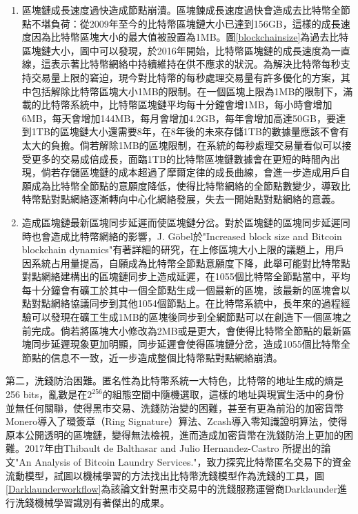 					\begin{enumerate}
						\item 區塊鏈成⾧速度過快造成節點崩潰。區塊鍊成長速度過快會造成去比特幣全節點不堪負荷：從2009年至今的比特幣區塊鏈大小已達到156GB，這樣的成長速度因為比特幣區塊大小的最大值被設置為1MB。圖\ref{blockchainsize}為過去比特區塊鏈大小，圖中可以發現，於2016年開始，比特幣區塊鏈的成長速度為一直線，這表示著比特幣網絡中持續維持在供不應求的狀況。為解決比特幣每秒⽀持交易量上限的窘迫，現今對⽐特幣的每秒處理交易量有許多優化的⽅案，其中包括解除比特幣區塊大小1MB的限制。在一個區塊上限為1MB的限制下，滿載的比特幣系統中，比特幣區塊鏈平均每十分鐘會增1MB，每小時會增加6MB，每天會增加144MB，每月會增加4.2GB，每年會增加高達50GB，要達到1TB的區塊鏈大小還需要8年，在8年後的未來存儲1TB的數據量應該不會有太大的負擔。倘若解除1MB的區塊限制，在系統的每秒處理交易量看似可以接受更多的交易成倍成長，面臨1TB的比特幣區塊鏈數據會在更短的時間內出現，倘若存儲區塊鏈的成本超過了摩爾定律的成長曲線，會進一步造成用戶自願成為比特幣全節點的意願度降低，使得比特幣網絡的全節點數變少，導致比特幣點對點網絡逐漸轉向中心化網絡發展，失去一開始點對點網絡的意義。

						\item 造成區塊鏈最新區塊同步延遲而使區塊鏈分岔。對於區塊鏈的區塊同步延遲同時也會造成比特幣網絡的影響，J. Göbel於"Increased block size and Bitcoin blockchain dynamics"\supercite{TelecommunicationNetworksandApplicationsConferenceITNAC201727thInternational}有著詳細的研究，在上修區塊大小上限的議題上，用戶因系統占用量提高，⾃願成為⽐特幣全節點意願度下降，此舉可能對⽐特幣點對點網絡建構出的區塊鏈同步上造成延遲，在1055個比特幣全節點當中，平均每十分鐘會有礦工於其中一個全節點生成一個最新的區塊，該最新的區塊會以點對點網絡協議同步到其他1054個節點上。在比特幣系統中，長年來的過程經驗可以發現在礦工生成1MB的區塊後同步到全網節點可以在創造下一個區塊之前完成。倘若將區塊大小修改為2MB或是更大，會使得比特幣全節點的最新區塊同步延遲現象更加明顯，同步延遲會使得區塊鏈分岔，造成1055個比特幣全節點的信息不一致，近一步造成整個比特幣點對點網絡崩潰。
					\end{enumerate}
					

				第二，洗錢防治困難。匿名性為比特幣系統一大特色，比特幣的地址生成的熵是256 bits，亂數是在$2^{256}$的組態空間中隨機選取，這樣的地址與現實生活中的身份並無任何關聯，使得黑市交易、洗錢防治變的困難，甚至有更為前沿的加密貨幣Monero\supercite{noether2014monero}導入了環簽章（Ring Signature）\supercite{Thresholdringsignaturesandapplicationstoad-hocgroups}算法、Zcash\supercite{zhong2002faster}導入零知識證明算法\supercite{Zero-KnowledgeProofsofIdentity}，使得原本公開透明的區塊鏈，變得無法檢視，進而造成加密貨幣在洗錢防治上更加的困難。2017年由Thibault de Balthasar and Julio Hernandez-Castro 所提出的論文"An Analysis of Bitcoin Laundry Services."\supercite{AnAnalysisofBitcoinLaundryServices}，致⼒探究⽐特幣匿名交易下的資⾦流動模型，試圖以機械學習的方法找出比特幣洗錢模型作為洗錢的工具，圖\ref{Darklaunderworkflow}為該論文針對黑市交易中的洗錢服務運營商Darklaunder進行洗錢機械學習識別有著傑出的成果。

